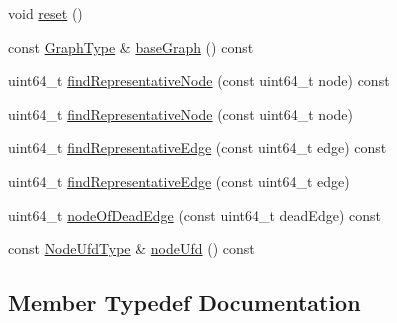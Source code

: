 \begin{DoxyCompactItemize}
void \hyperlink{classnifty_1_1graph_1_1EdgeContractionGraphWithSets_a26b35f687abffaf422f779bf0922f3de}{reset} ()
\item 
const \hyperlink{classnifty_1_1graph_1_1EdgeContractionGraphWithSets_abadbbebcd10e37a1a3f59bb967accdf0}{Graph\+Type} \& \hyperlink{classnifty_1_1graph_1_1EdgeContractionGraphWithSets_a1d8c4aa00f646e178a31a38153a9c374}{base\+Graph} () const
\item 
uint64\+\_\+t \hyperlink{classnifty_1_1graph_1_1EdgeContractionGraphWithSets_a365553058cdb73930265f2ee8c59fc3b}{find\+Representative\+Node} (const uint64\+\_\+t node) const
\item 
uint64\+\_\+t \hyperlink{classnifty_1_1graph_1_1EdgeContractionGraphWithSets_ac8441861738a40c90408a3d6fbdd5ecd}{find\+Representative\+Node} (const uint64\+\_\+t node)
\item 
uint64\+\_\+t \hyperlink{classnifty_1_1graph_1_1EdgeContractionGraphWithSets_af001864ce94e2f79c123b318ba9122af}{find\+Representative\+Edge} (const uint64\+\_\+t edge) const
\item 
uint64\+\_\+t \hyperlink{classnifty_1_1graph_1_1EdgeContractionGraphWithSets_a287efe08f0cbc8824a3bf6ce525af9ae}{find\+Representative\+Edge} (const uint64\+\_\+t edge)
\item 
uint64\+\_\+t \hyperlink{classnifty_1_1graph_1_1EdgeContractionGraphWithSets_ab3800af3726fe0fb6b2b4280dd1c58c1}{node\+Of\+Dead\+Edge} (const uint64\+\_\+t dead\+Edge) const
\item 
const \hyperlink{classnifty_1_1graph_1_1EdgeContractionGraphWithSets_ae340ffb867bc1eb19b139e879174607e}{Node\+Ufd\+Type} \& \hyperlink{classnifty_1_1graph_1_1EdgeContractionGraphWithSets_a00c248e34c7d08d44a9ef5a630c28ebc}{node\+Ufd} () const
\end{DoxyCompactItemize}


\subsection{Member Typedef Documentation}
\mbox{\label{classnifty_1_1graph_1_1EdgeContractionGraphWithSets_ab4782e97223ab8ba2d207325aae693d6}} 
